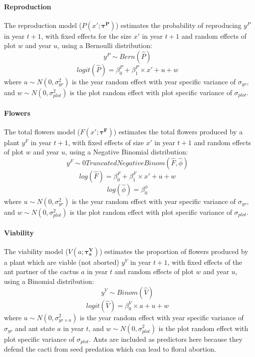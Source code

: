 \documentclass[11pt]{article}
\begin{document}
\paragraph{Reproduction}
The reproduction model ($P(x';\pmb{\tau^{P}})$) estimates the probability of reproducing $y^P$ in year $t+1$, with fixed effects for the size $x'$ in year $t+1$ and random effects of plot $w$ and year $u$, using a Bernoulli distribution:
$$y^P \sim Bern(\hat{P})$$
$$logit(\hat{P}) = \beta_{0}^{P} + \beta_{1}^{P} \times x' + u + w$$
where $u \sim N(0,\sigma_{yr}^{2})$ is the year random effect with year specific variance of $\sigma_{yr}$, and $w \sim N(0,\sigma_{plot}^{2})$ is the plot random effect with plot specific variance of $\sigma_{plot}$.

\paragraph{Flowers}
The total flowers model ($F(x';\pmb{\tau^{F}})$) estimates the total flowers produced by a plant $y^F$ in year $t+1$, with fixed effects of size $x'$ in year $t+1$ and random effects of plot $w$ and year $u$, using a Negative Binomial distribution:
$$y^{F} \sim 0 Truncated Negative Binom(\hat{F},\hat{\phi})$$
$$log(\hat{F}) = \beta_{0}^{F} + \beta_{1}^{F} \times x' + u + w$$
$$log(\hat{\phi}) = \beta_{0}^{\phi}$$
where $u \sim N(0,\sigma_{yr}^{2})$ is the year random effect with year specific variance of $\sigma_{yr}$, and $w \sim N(0,\sigma_{plot}^{2})$ is the plot random effect with plot specific variance of $\sigma_{plot}$.

\paragraph{Viability}
The viability model ($V(a;\pmb{\tau^{V}_{a}})$) estimates the proportion of flowers produced by a plant which are viable (not aborted) $y^V$ in year $t+1$, with fixed effects of the ant partner of the cactus $a$ in year $t$ and random effects of plot $w$ and year $u$, using a Binomial distribution:
$$y^{V} \sim Binom(\hat{V})$$
$$logit(\hat{V}) = \beta_{0}^{V} \times a + u + w$$
where $u \sim N(0,\sigma_{yr \times a}^{2})$ is the year random effect with year specific variance of $\sigma_{yr}$ and ant state $a$ in year $t$, and $w \sim N(0,\sigma_{plot}^{2})$ is the plot random effect with plot specific variance of $\sigma_{plot}$.
Ants are included as predictors here because they defend the cacti from seed predation which can lead to floral abortion. 
\end{document}

